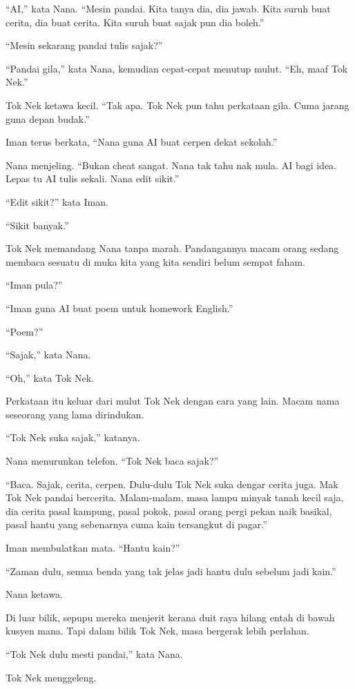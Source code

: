 \documentclass[
  11pt,
  a5paper,
  openany,
  oneside]{book}
\begin{document}
``AI,'' kata Nana. ``Mesin pandai. Kita tanya dia, dia jawab. Kita suruh
buat cerita, dia buat cerita. Kita suruh buat sajak pun dia boleh.''

``Mesin sekarang pandai tulis sajak?''

``Pandai gila,'' kata Nana, kemudian cepat-cepat menutup mulut. ``Eh,
maaf Tok Nek.''

Tok Nek ketawa kecil. ``Tak apa. Tok Nek pun tahu perkataan gila. Cuma
jarang guna depan budak.''

Iman terus berkata, ``Nana guna AI buat cerpen dekat sekolah.''

Nana menjeling. ``Bukan cheat sangat. Nana tak tahu nak mula. AI bagi
idea. Lepas tu AI tulis sekali. Nana edit sikit.''

``Edit sikit?'' kata Iman.

``Sikit banyak.''

Tok Nek memandang Nana tanpa marah. Pandangannya macam orang sedang
membaca sesuatu di muka kita yang kita sendiri belum sempat faham.

``Iman pula?''

``Iman guna AI buat poem untuk homework English.''

``Poem?''

``Sajak,'' kata Nana.

``Oh,'' kata Tok Nek.

Perkataan itu keluar dari mulut Tok Nek dengan cara yang lain. Macam
nama seseorang yang lama dirindukan.

``Tok Nek suka sajak,'' katanya.

Nana menurunkan telefon. ``Tok Nek baca sajak?''

``Baca. Sajak, cerita, cerpen. Dulu-dulu Tok Nek suka dengar cerita
juga. Mak Tok Nek pandai bercerita. Malam-malam, masa lampu minyak tanah
kecil saja, dia cerita pasal kampung, pasal pokok, pasal orang pergi
pekan naik basikal, pasal hantu yang sebenarnya cuma kain tersangkut di
pagar.''

Iman membulatkan mata. ``Hantu kain?''

``Zaman dulu, semua benda yang tak jelas jadi hantu dulu sebelum jadi
kain.''

Nana ketawa.

Di luar bilik, sepupu mereka menjerit kerana duit raya hilang entah di
bawah kusyen mana. Tapi dalam bilik Tok Nek, masa bergerak lebih
perlahan.

``Tok Nek dulu mesti pandai,'' kata Nana.

Tok Nek menggeleng.
\end{document}
